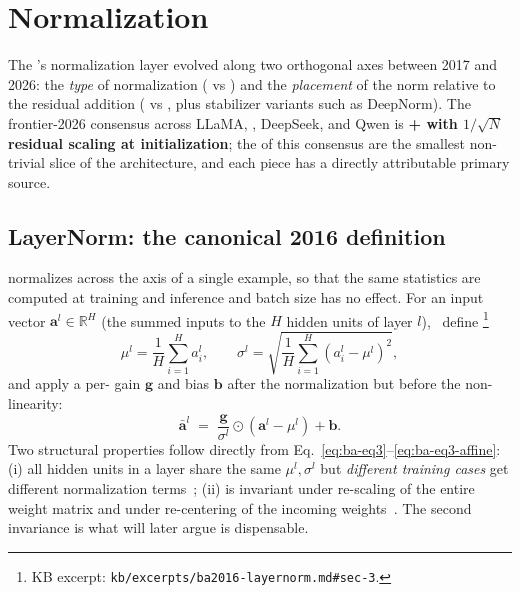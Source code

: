 
\section{Normalization}
\label{sec:normalization-axis}
\label{sec:norm}

The 's normalization layer evolved along two orthogonal axes
between 2017 and 2026: the \emph{type} of normalization ( vs
) and the \emph{placement} of the norm relative to the residual
addition ( vs , plus stabilizer variants such as DeepNorm).
The frontier-2026 consensus across LLaMA, , DeepSeek, and Qwen is
\textbf{ +  with $1/\sqrt{N}$ residual scaling at
initialization}; the  of this consensus are the smallest
non-trivial slice of the architecture, and each piece has a directly
attributable primary source.

\subsection{LayerNorm: the canonical 2016 definition}
\label{sec:norm-layernorm}

 normalizes across the  axis of a single example, so
that the same statistics are computed at training and inference and
batch size has no effect. For an input vector
$\mathbf{a}^l \in \mathbb{R}^H$ (the summed inputs to the $H$ hidden
units of layer $l$),~\citet{ba2016-layernorm} define%
\footnote{KB excerpt: \texttt{kb/excerpts/ba2016-layernorm.md\#sec-3}.}
\begin{equation}
  \mu^l = \frac{1}{H} \sum_{i=1}^{H} a_i^l,
  \qquad
  \sigma^l = \sqrt{\frac{1}{H} \sum_{i=1}^{H} (a_i^l - \mu^l)^2},
  \tag{Ba--Eq.~3}
  \label{eq:ba-eq3}
\end{equation}
and apply a per- gain $\mathbf{g}$ and bias $\mathbf{b}$ after
the normalization but before the non-linearity:
\begin{equation}
  \bar{\mathbf{a}}^l \;=\; \frac{\mathbf{g}}{\sigma^l} \odot
  (\mathbf{a}^l - \mu^l) + \mathbf{b}.
  \label{eq:ba-eq3-affine}
\end{equation}
Two structural properties follow directly from
Eq.~\eqref{eq:ba-eq3}--\eqref{eq:ba-eq3-affine}: (i) all hidden units in
a layer share the same $\mu^l, \sigma^l$ but \emph{different training
cases} get different normalization terms~\citep[\S 3]{ba2016-layernorm};
(ii)  is invariant under re-scaling of the entire weight
matrix and under re-centering of the incoming
weights~\citep[\S 4, Table~1]{ba2016-layernorm}. The second invariance
is what \citet{zhang2019} will later argue is dispensable.

